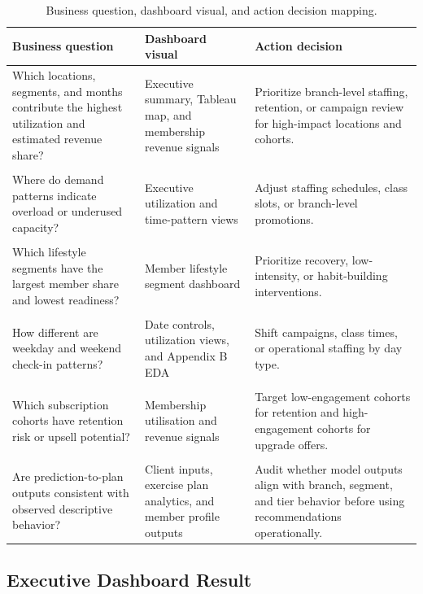 \documentclass{aitthesis}
\begin{document}
\begin{table}[htbp]
\centering
\small
\caption{Business question, dashboard visual, and action decision mapping.}
\label{tab:chapter4_business_visual_action}
\begin{tabularx}{\linewidth}{p{4.2cm}p{3.6cm}X}
\toprule
\textbf{Business question} & \textbf{Dashboard visual} & \textbf{Action decision} \\
\midrule
Which locations, segments, and months contribute the highest utilization and estimated revenue share? & Executive summary, Tableau map, and membership revenue signals & Prioritize branch-level staffing, retention, or campaign review for high-impact locations and cohorts. \\[18pt]
\hline\\[-8pt]
Where do demand patterns indicate overload or underused capacity? & Executive utilization and time-pattern views & Adjust staffing schedules, class slots, or branch-level promotions. \\[18pt]
\hline\\[-8pt]
Which lifestyle segments have the largest member share and lowest readiness? & Member lifestyle segment dashboard & Prioritize recovery, low-intensity, or habit-building interventions. \\[18pt]
\hline\\[-8pt]
How different are weekday and weekend check-in patterns? & Date controls, utilization views, and Appendix B EDA & Shift campaigns, class times, or operational staffing by day type. \\[18pt]
\hline\\[-8pt]
Which subscription cohorts have retention risk or upsell potential? & Membership utilisation and revenue signals & Target low-engagement cohorts for retention and high-engagement cohorts for upgrade offers. \\[18pt]
\hline\\[-8pt]
Are prediction-to-plan outputs consistent with observed descriptive behavior? & Client inputs, exercise plan analytics, and member profile outputs & Audit whether model outputs align with branch, segment, and tier behavior before using recommendations operationally. \\
\bottomrule
\end{tabularx}
\end{table}

\subsection{Executive Dashboard Result}
\end{document}
